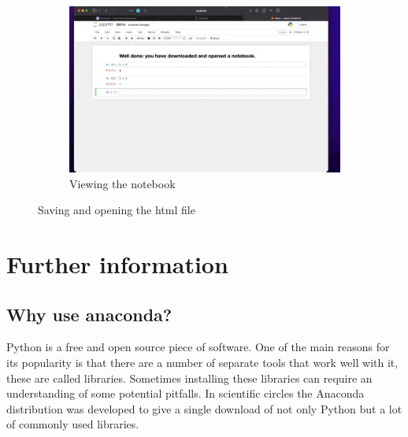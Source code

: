 \begin{enumerate}
\begin{figure}[!htbp]
                \begin{subfigure}[b]{0.3\textwidth}
                    \includegraphics[width=\textwidth]{assets/downloading_a_notebook/main00498.png}
                    \caption{Viewing the notebook}
                    \label{fig:viewing_the_notebook}
                \end{subfigure}
                \caption{Saving and opening the html file}
                \label{fig:downloading_a_notebook}
        \end{figure}

\end{enumerate}

\section{Further information}

\subsection{Why use anaconda?}

Python is a free and open source piece of software. One of the main reasons for
its popularity is that there are a number of separate tools that work well with
it, these are called libraries. Sometimes installing these libraries can require
an understanding of some potential pitfalls. In scientific circles the Anaconda
distribution was developed to give a single download of not only Python but a
lot of commonly used libraries.


